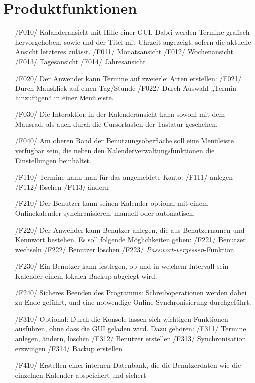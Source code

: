 \documentclass[a4paper]{article}
\begin{document}
  \section{Produktfunktionen}
    \begin{itemize}

			\item[/F010/] Kalanderansicht mit Hilfe einer GUI. Dabei werden Termine grafisch hervorgehoben, sowie und der Titel mit Uhrzeit angezeigt, sofern die aktuelle Ansicht letzteres zulässt.
				\subitem /F011/ Monatsansicht
				\subitem /F012/ Wochenansicht
				\subitem /F013/ Tagesansicht
				\subitem /F014/ Jahresansicht

			\item[/F020/] Der Anwender kann Termine auf zweierlei Arten erstellen:
				\subitem /F021/ Durch Mausklick auf einen Tag/Stunde
				\subitem /F022/ Durch Auswahl „Termin hinzufügen“ in einer Menüleiste.

			\item[/F030/] Die Interaktion in der Kalenderansicht kann sowohl mit dem Mausrad, als auch durch die Cursortasten der Tastatur geschehen.

			\item[/F040/] Am oberen Rand der Benutzungsoberfläche soll eine Menüleiste verfügbar sein, die neben den Kalenderverwaltungsfunktionen die Einstellungen beinhaltet.

			\item[/F110/] Termine kann man für das angemeldete Konto:
			  \subitem /F111/ anlegen
			  \subitem /F112/ löschen
			  \subitem /F113/ ändern

			\item[/F210/] Der Benutzer kann seinen Kalender optional mit einem Onlinekalender synchronisieren, manuell oder automatisch.
			\item[/F220/] Der Anwender kann Benutzer anlegen, die aus Benutzernamen und Kennwort bestehen. Es soll folgende Möglichkeiten geben:
				\subitem /F221/ Benutzer wechseln
				\subitem /F222/ Benutzer löschen
				\subitem /F223/ \textit{Passwort-vergessen}-Funktion
			\item[/F230/] Ein Benutzer kann festlegen, ob und in welchem Intervall sein Kalender einem lokalen Backup abgelegt wird.
			\item[/F240/] Sicheres Beenden des Programms: Schreiboperationen werden dabei zu Ende geführt, und eine notwendige Online-Synchronisierung durchgeführt.
		  \item[/F310/] Optional: Durch die Konsole lassen sich wichtigen Funktionen ausführen, ohne dass die GUI geladen wird. Dazu gehören:
				\subitem /F311/ Termine anlegen, ändern, löschen
			  \subitem /F312/ Benutzer erstellen
			  \subitem /F313/ Synchronisation erzwingen
			  \subitem /F314/ Backup erstellen
			\item[/F410/] Erstellen einer internen Datenbank, die die Benutzerdaten wie die einzelnen Kalender abspeichert und sichert
			\end{itemize}
\end{document}
